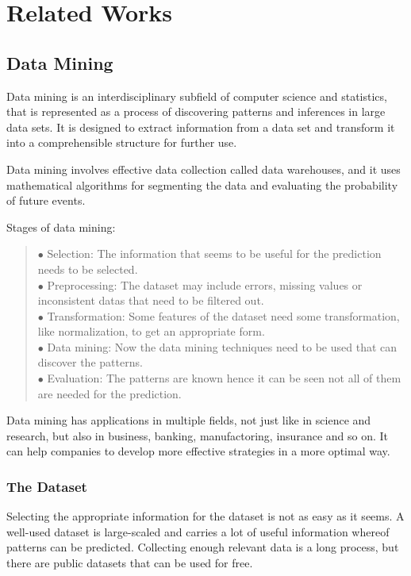 \chapter{Related Works}

\section{Data Mining}

Data mining is an interdisciplinary subfield of computer science and statistics, that is represented as a process of discovering patterns and inferences in large data sets. It is designed to extract information from a data set and transform it into a comprehensible structure for further use. \medskip

Data mining involves effective data collection called data warehouses, and it uses mathematical algorithms for segmenting the data and evaluating the probability of future events. 

\medskip \noindent Stages of data mining:
\begin{verse}
	$\bullet$ Selection: The information that seems to be useful for the prediction needs to be selected.\\
	$\bullet$ Preprocessing: The dataset may include errors, missing values or inconsistent datas that need to be filtered out.\\
	$\bullet$ Transformation: Some features of the dataset need some transformation, like normalization, to get an appropriate form.\\
	$\bullet$ Data mining: Now the data mining techniques need to be used that can discover the patterns.\\
	$\bullet$ Evaluation: The patterns are known hence it can be seen not all of them are needed for the prediction.
\end{verse}

Data mining has applications in multiple fields, not just like in science and research, but also in business, banking, manufactoring, insurance and so on. It can help companies to develop more effective strategies in a more optimal way.



\subsection{The Dataset}

Selecting the appropriate information for the dataset is not as easy as it seems. A well-used dataset is large-scaled and carries a lot of useful information whereof patterns can be predicted. Collecting enough relevant data is a long process, but there are public datasets that can be used for free. \medskip

